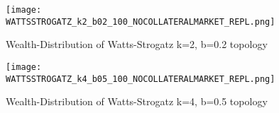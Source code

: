 \documentclass[Bachelorarbeit.tex]{subfiles}
\begin{document}
\begin{figure}[H]
	\centering
  \texttt{[image: WATTSSTROGATZ\_k2\_b02\_100\_NOCOLLATERALMARKET\_REPL.png]}
	\caption{Wealth-Distribution of Watts-Strogatz k=2, b=0.2 topology}
	\label{fig:wealth_WATTSSTROGATZ_k2_b02_100_NOCOLLATERALMARKET_REPL}
\end{figure}

\begin{figure}[H]
	\centering
  \texttt{[image: WATTSSTROGATZ\_k4\_b05\_100\_NOCOLLATERALMARKET\_REPL.png]}
	\caption{Wealth-Distribution of Watts-Strogatz k=4, b=0.5 topology}
	\label{fig:wealth_WATTSSTROGATZ_k4_b05_100_NOCOLLATERALMARKET_REPL}
\end{figure}
\end{document}
